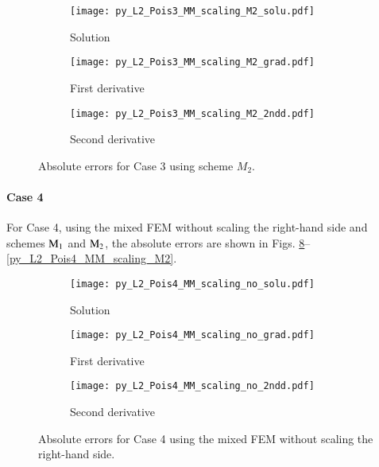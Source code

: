 \documentclass[review,3p]{elsarticle}
\begin{document}
\begin{figure}[!ht]
    \begin{subfigure}{5.5cm}
        \texttt{[image: py\_L2\_Pois3\_MM\_scaling\_M2\_solu.pdf]}
        \caption{Solution}
        \label{py_L2_Pois3_MM_scaling_M2_solu}
    \end{subfigure}
    \hspace{-0.2cm}
    \begin{subfigure}{5.5cm}
        \texttt{[image: py\_L2\_Pois3\_MM\_scaling\_M2\_grad.pdf]}
        \caption{First derivative}
        \label{py_L2_Pois3_MM_scaling_M2_grad}
    \end{subfigure}
    \hspace{-0.2cm}
    \begin{subfigure}{5.5cm}
        \texttt{[image: py\_L2\_Pois3\_MM\_scaling\_M2\_2ndd.pdf]}
        \caption{Second derivative}
        \label{py_L2_Pois3_MM_scaling_M2_2ndd}
    \end{subfigure}
\caption{Absolute errors for Case 3 using scheme $M_2$.}
\label{py_L2_Pois3_MM_scaling_M2}
\end{figure}

\newpage
\paragraph{Case 4}
For Case 4, using the mixed FEM without scaling the right-hand side and schemes ${\rm M}_1$ and ${\rm M}_2$, the absolute errors are shown in Figs. \ref{py_L2_Pois4_MM_scaling_no}--\ref{py_L2_Pois4_MM_scaling_M2}.

\begin{figure}[!ht]
    \begin{subfigure}{5.5cm}
        \texttt{[image: py\_L2\_Pois4\_MM\_scaling\_no\_solu.pdf]}
        \caption{Solution}
        \label{py_L2_Pois4_MM_scaling_no_solu}
    \end{subfigure}
    \hspace{-0.2cm}
    \begin{subfigure}{5.5cm}
        \texttt{[image: py\_L2\_Pois4\_MM\_scaling\_no\_grad.pdf]}
        \caption{First derivative}
        \label{py_L2_Pois4_MM_scaling_no_grad}
    \end{subfigure}
    \hspace{-0.2cm}
    \begin{subfigure}{5.5cm}
        \texttt{[image: py\_L2\_Pois4\_MM\_scaling\_no\_2ndd.pdf]}
        \caption{Second derivative}
        \label{py_L2_Pois4_MM_scaling_no_2ndd}
    \end{subfigure}
\caption{Absolute errors for Case 4 using the mixed FEM without scaling the right-hand side.}
\label{py_L2_Pois4_MM_scaling_no}
\end{figure}
\end{document}
